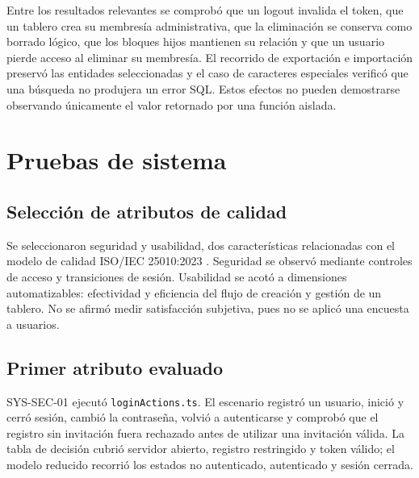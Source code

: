 \documentclass[conference]{IEEEtran}
\begin{document}
Entre los resultados relevantes se comprobó que un logout invalida el token, que un tablero crea su membresía administrativa, que la eliminación se conserva como borrado lógico, que los bloques hijos mantienen su relación y que un usuario pierde acceso al eliminar su membresía. El recorrido de exportación e importación preservó las entidades seleccionadas y el caso de caracteres especiales verificó que una búsqueda no produjera un error SQL. Estos efectos no pueden demostrarse observando únicamente el valor retornado por una función aislada.
\vspace{\baselineskip}

\section{Pruebas de sistema}

\subsection{Selección de atributos de calidad}
Se seleccionaron seguridad y usabilidad, dos características relacionadas con el modelo de calidad ISO/IEC 25010:2023 \cite{iso25010}. Seguridad se observó mediante controles de acceso y transiciones de sesión. Usabilidad se acotó a dimensiones automatizables: efectividad y eficiencia del flujo de creación y gestión de un tablero. No se afirmó medir satisfacción subjetiva, pues no se aplicó una encuesta a usuarios.
\vspace{\baselineskip}

\subsection{Primer atributo evaluado}
SYS-SEC-01 ejecutó \texttt{loginActions.ts}. El escenario registró un usuario, inició y cerró sesión, cambió la contraseña, volvió a autenticarse y comprobó que el registro sin invitación fuera rechazado antes de utilizar una invitación válida. La tabla de decisión cubrió servidor abierto, registro restringido y token válido; el modelo reducido recorrió los estados no autenticado, autenticado y sesión cerrada.
\vspace{\baselineskip}
\end{document}
